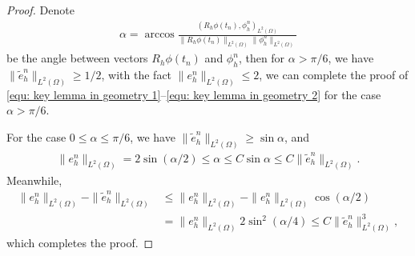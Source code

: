 \documentclass{siamart250211}
\begin{document}
\begin{proof}
	Denote
    \begin{align*}
    \alpha=\arccos\frac{(R_h\phi(t_n),\phi_h^n)_{L^2(\Omega)}}{\|R_h\phi(t_n)\|_{L^2(\Omega)}\|\phi_h^n\|_{L^2(\Omega)}}
    \end{align*}
    be the angle between vectors $R_h\phi(t_n)$ and $\phi_h^n$, then for $\alpha > \pi/6$, we have $\|\tilde{e}_h^n\|_{L^2(\Omega)} \ge 1/2$, with the fact $\|e_h^n\|_{L^2(\Omega)} \le 2$, we can complete the proof of \eqref{equ: key lemma in geometry 1}--\eqref{equ: key lemma in geometry 2} for the case $\alpha > \pi/6$. 
	
	For the case $0 \le \alpha \le \pi/6$, we have $\|\tilde{e}_h^n\|_{L^2(\Omega)} \ge \sin\alpha$, and 
	\begin{align*}
		\|e_h^n\|_{L^2(\Omega)} = 2\sin(\alpha/2) \le \alpha \le C \sin\alpha \le C \|\tilde{e}_h^n\|_{L^2(\Omega)}.
	\end{align*}
	Meanwhile, 
	\begin{align*}
		\|e_h^n\|_{L^2(\Omega)} - \|\tilde{e}_h^n\|_{L^2(\Omega)} &  \le \|e_h^n\|_{L^2(\Omega)} - \|e_h^n\|_{L^2(\Omega)}\cos(\alpha/2) \\
		& = \|e_h^n\|_{L^2(\Omega)} 2\sin^2(\alpha/4) \le C \|\tilde{e}_h^n\|_{L^2(\Omega)}^3,
	\end{align*}
	which completes the proof.
\end{proof}



\end{document}
